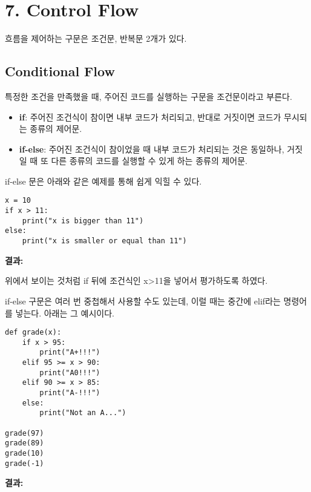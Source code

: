 \section[{7. Control Flow - {\it 흐름의 제어}}]{7. Control Flow}

흐름을 제어하는 구문은 조건문, 반복문 2개가 있다.

\subsection{Conditional Flow}

특정한 조건을 만족했을 때, 주어진 코드를 실행하는 구문을 조건문이라고 부른다.

\begin{itemize}
    \item \textbf{if}: 주어진 조건식이 참이면 내부 코드가 처리되고, 반대로 거짓이면 코드가 무시되는 종류의 제어문.
    \item \textbf{if-else}: 주어진 조건식이 참이었을 때 내부 코드가 처리되는 것은 동일하나, 거짓일 때 또 다른 종류의 코드를 실행할 수 있게 하는 종류의 제어문.
\end{itemize}

if-else 문은 아래와 같은 예제를 통해 쉽게 익힐 수 있다.

\begin{minipage}{\textwidth}
\begin{tcolorbox}[colframe=black, colback=white]
\begin{verbatim}
x = 10
if x > 11:
    print("x is bigger than 11")
else:
    print("x is smaller or equal than 11")
\end{verbatim}
\end{tcolorbox}
\textbf{결과: }
\end{minipage}

위에서 보이는 것처럼 if 뒤에 조건식인 x>11을 넣어서 평가하도록 하였다.

if-else 구문은 여러 번 중첩해서 사용할 수도 있는데, 이럴 때는 중간에 elif라는 명령어를 넣는다. 아래는 그 예시이다.

\begin{minipage}{\textwidth}
\begin{tcolorbox}[colframe=black, colback=white]
\begin{verbatim}
def grade(x):
    if x > 95:
        print("A+!!!")
    elif 95 >= x > 90:
        print("A0!!!")
    elif 90 >= x > 85:
        print("A-!!!")
    else:
        print("Not an A...")

grade(97)
grade(89)
grade(10)
grade(-1)
\end{verbatim}
\end{tcolorbox}
\textbf{결과: }
\end{minipage}

